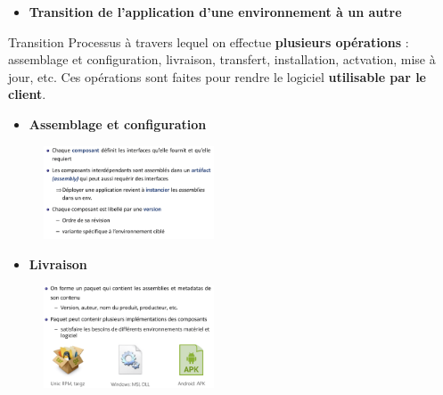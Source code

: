 \documentclass[16pt]{report}
\begin{document}
\begin{multicols*}{2}
    \begin{itemize}
        \item \textbf{Transition de l'application d'une environnement à un autre}  
    \end{itemize}  
    \begin{Definitionx}{Transition}{}
        Processus à travers lequel on effectue \textbf{plusieurs opérations} : assemblage et configuration, 
        livraison, transfert, installation, actvation, mise à jour, etc. Ces opérations 
        sont faites pour rendre le logiciel \textbf{utilisable par le client}.   
    \end{Definitionx}


    \begin{itemize}
        \item \textbf{Assemblage et configuration}  
    \end{itemize}

    \begin{figure}[H]
        \begin{center}
            \includegraphics[width=0.45\textwidth]{Deploiement1.png}
        \end{center}
    \end{figure}
    



    \begin{itemize}
        \item \textbf{Livraison}  
    \end{itemize}
    

    \begin{figure}[H]
        \begin{center}
            \includegraphics[width=0.45\textwidth]{Deploiement2.png}
        \end{center}
    \end{figure}
    

\end{multicols*}
\end{document}
